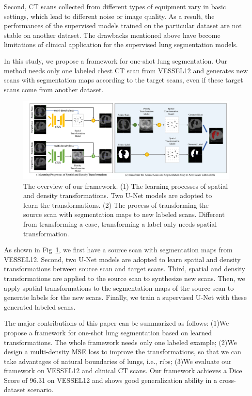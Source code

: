 \documentclass{article}
\begin{document}
Second, CT scans collected from different types of equipment vary in basic settings, which lead to different noise or image quality. As a result, the performances of the supervised models trained on the particular dataset are not stable on another dataset.
The drawbacks mentioned above have become limitations of clinical application for the supervised lung segmentation models.

In this study, we propose a framework for one-shot lung segmentation. Our method needs only one labeled chest CT scan from VESSEL12 and generates new scans with segmentation maps according to the target scans, even if these target scans come from another dataset.
\begin{figure}[htbp]
    \centerline{\includegraphics[width=180mm]{transarti2.pdf}}
    \vspace{-0.5cm}
    \caption{The overview of our framework. (1) The learning processes of spatial and density transformations. Two U-Net models are adopted to learn the transformations. (2) The process of transforming the source scan with segmentation maps to new labeled scans. Different from transforming a case, transforming a label only needs spatial transformation.
    }
    \vspace{-0.3cm}
    \label{transarti}
    \end{figure}
As shown in Fig~\ref{transarti}, we first have a source scan with segmentation maps from VESSEL12. Second, two U-Net models are adopted to learn spatial and density transformations between source scan and target scans. Third, spatial and density transformations are applied to the source scan to synthesize new scans. Then, we apply spatial transformations to the segmentation maps of the source scan to generate labels for the new scans. Finally, we train a supervised U-Net with these generated labeled scans.


The major contributions of this paper can be summarized as follows:
(1)We propose a framework for one-shot lung segmentation based on learned transformations. The whole framework needs only one labeled example; (2)We design a multi-density MSE loss to improve the transformations, so that we can take advantages of natural boundaries of lungs, i.e., ribs; (3)We evaluate our framework on VESSEL12 and clinical CT scans. Our framework achieves a Dice Score of 96.31 on VESSEL12 and shows good generalization ability in a cross-dataset scenario.
\end{document}
